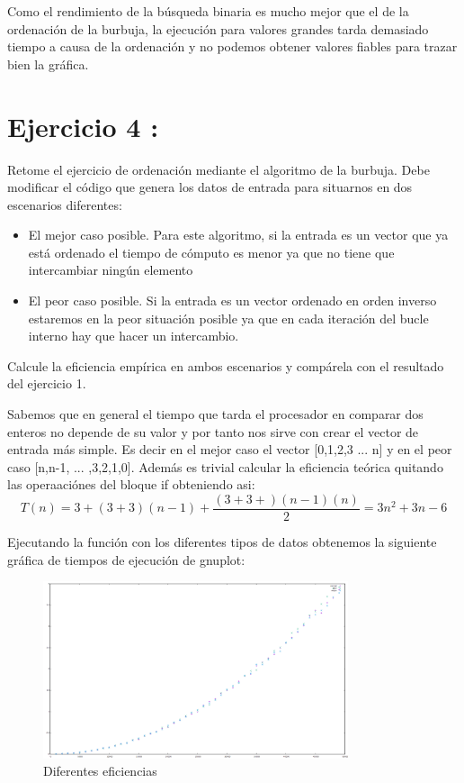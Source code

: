 \documentclass{article}
\begin{document}
	Como el rendimiento de la b\'usqueda binaria es mucho mejor que el de la ordenaci\'on de la burbuja, la ejecuci\'on para valores grandes tarda demasiado tiempo a causa de la ordenaci\'on y no podemos obtener valores fiables para trazar bien la gr\'afica.

\clearpage
\section{Ejercicio 4 :}
Retome el ejercicio de ordenación mediante el algoritmo de la burbuja. Debe modificar el
código que genera los datos de entrada para situarnos en dos escenarios diferentes:
\begin{itemize}
	\item El mejor caso posible. Para este algoritmo, si la entrada es un vector que ya está ordenado el tiempo de cómputo es menor ya que no tiene que intercambiar ningún elemento
	\item El peor caso posible. Si la entrada es un vector ordenado en orden inverso estaremos en la peor situación posible ya que en cada iteración del bucle interno hay que hacer un intercambio.
\end{itemize}
	Calcule la eficiencia empírica en ambos escenarios y compárela con el resultado del ejercicio 1.
\clearpage

Sabemos que en general el tiempo que tarda el procesador en comparar dos enteros no depende de su valor y por tanto nos sirve con crear el vector de entrada m\'as simple. Es decir en el mejor caso el vector [0,1,2,3 ... n] y en el peor caso [n,n-1, ... ,3,2,1,0]. Adem\'as es trivial calcular la eficiencia te\'orica quitando las operaaci\'ones del bloque if obteniendo asi:
	\begin{equation}
			T(n) = 3 + (3+3)(n-1) + \frac{(3+3+)(n-1)(n)}{2} = 3n^2 + 3n -6
	\end{equation}

	Ejecutando la funci\'on con los diferentes tipos de datos obtenemos la siguiente gr\'afica de tiempos de ejecuci\'on de gnuplot:
		\begin{figure}[H]
  		\caption{Diferentes eficiencias}
  		\centering
  		\includegraphics[width=0.8\textwidth]{ejer4/grafica.png}
	\end{figure}
	
\end{document}
